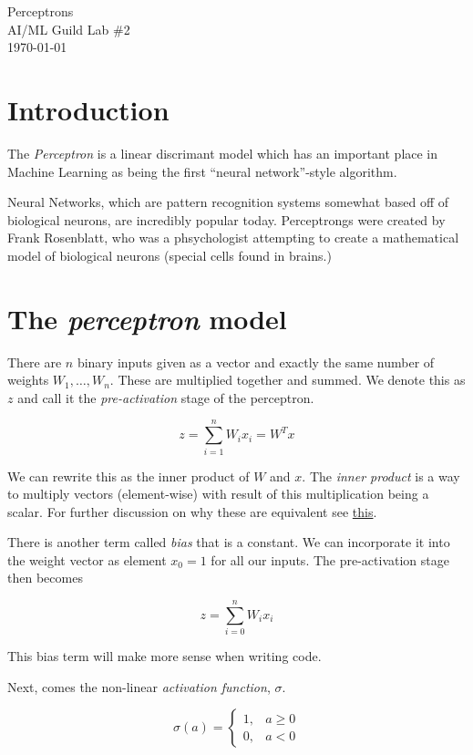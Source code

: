 \documentclass[letterpaper,12pt]{article}
\begin{document}
\begin{flushleft}
Perceptrons\\
AI/ML Guild Lab \#2\\
\today \\
\end{flushleft}

\section{Introduction}

The \emph{Perceptron} is a linear discrimant model which has an important place
in Machine Learning as being the first ``neural network''-style algorithm.

Neural Networks, which are pattern recognition systems somewhat based off of
biological neurons, are incredibly popular today. Perceptrongs were created by
Frank Rosenblatt, who was a phsychologist attempting to create a mathematical
model of biological neurons (special cells found in brains.)

\section{The \emph{perceptron} model}

There are $n$ binary inputs given as a vector and exactly the same number of
weights $W_1, \ldots, W_n$.  These are multiplied together and summed. We denote
this as $z$ and call it the \emph{pre-activation} stage of the perceptron.

\[
    z = \sum_{i=1}^{n} W_i x_i = W^{T}x
\]

We can rewrite this as the inner product of $W$ and $x$. The \emph{inner
product} is a way to multiply vectors (element-wise) with result of this
multiplication being a scalar. For further discussion on why these are
equivalent see
\href{http://www.sharetechnote.com/html/Handbook_EngMath_Matrix_InnerProduct.html}{this}.

There is another term called \emph{bias} that is a constant. We can incorporate it
into the weight vector as element $x_0 = 1$ for all our inputs. The
pre-activation stage then becomes

\[
    z = \sum_{i=0}^{n} W_i x_i
\]

This bias term will make more sense when writing code.

Next, comes the non-linear \emph{activation function}, $\sigma$.

\[
    \sigma(a) =
    \begin{cases}
        1, & a \ge 0\\
        0, & a < 0
    \end{cases}
\]
\end{document}
